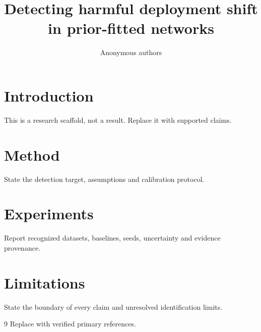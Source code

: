 \documentclass{article}
\title{Detecting harmful deployment shift in prior-fitted networks}
\author{Anonymous authors}
\begin{document}
\maketitle
\begin{abstract}

\end{abstract}
\section{Introduction}
This is a research scaffold, not a result. Replace it with supported claims.
\section{Method}
State the detection target, assumptions and calibration protocol.
\section{Experiments}
Report recognized datasets, baselines, seeds, uncertainty and evidence provenance.
\section{Limitations}
State the boundary of every claim and unresolved identification limits.
\label{crux:main-end}
\begin{thebibliography}{9}
 Replace with verified primary references.
\end{thebibliography}
\end{document}
